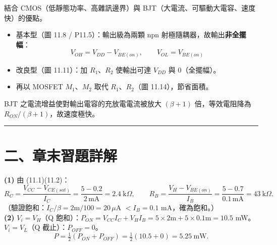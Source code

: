 \documentclass[12pt]{article}
\begin{document}
\begin{keybox}[11.3\ \ BiCMOS 電路（圖 P11.5）]
結合 CMOS（低靜態功率、高雜訊邊界）與 BJT（大電流、可驅動大電容、速度快）的優點。
\begin{itemize}[leftmargin=2.2em,itemsep=1pt]
  \item 基本型（圖 11.8 / P11.5）：輸出級為兩顆 npn 射極隨耦器，故輸出\textbf{非全擺幅}：
        \[ V_{OH}=V_{DD}-V_{BE(on)},\qquad V_{OL}=V_{BE(on)} \]
  \item 改良型（圖 11.11）：加 $R_1$、$R_2$ 使輸出可達 $V_{DD}$ 與 $0$（全擺幅）。
  \item 再以 MOSFET $M_1$、$M_2$ 取代 $R_1$、$R_2$（圖 11.14），節省面積。
\end{itemize}
BJT 之電流增益使對輸出電容的充放電電流被放大 $(\beta+1)$ 倍，等效電阻降為 $R_{ON}/(\beta+1)$，故速度極快。
\end{keybox}

\bigskip\hrule\vspace{0.6em}

\section*{二、章末習題詳解}

\medskip

\begin{minipage}{0.64\linewidth}
\end{minipage}\hfill
\begin{minipage}{0.33\linewidth}
\end{minipage}

\sol
\textbf{(1)} 由 (11.1)(11.2)：
\[ R_C=\frac{V_{CC}-V_{CE(sat)}}{I_C}=\frac{5-0.2}{2\,\text{mA}}=2.4\ \text{k}\Omega,\qquad
   R_B=\frac{V_H-V_{BE(on)}}{I_B}=\frac{5-0.7}{0.1\,\text{mA}}=43\ \text{k}\Omega. \]
（驗證飽和：$I_C/\beta=2\text{m}/100=20\,\mu$A $<I_B=0.1$ mA，確為飽和。）\\
\textbf{(2)} $V_i=V_H$（Q 飽和）：$P_{ON}=V_{CC}I_C+V_H I_B=5\times2\text{m}+5\times0.1\text{m}=10.5$ mW。
$V_i=V_L$（Q 截止）：$P_{OFF}=0$。
\[ P=\tfrac12(P_{ON}+P_{OFF})=\tfrac12(10.5+0)=5.25\ \text{mW}. \]
\end{document}
